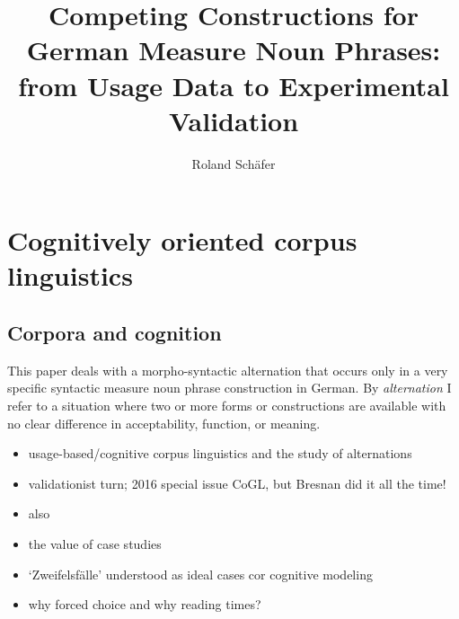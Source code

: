 \documentclass[USenglish]{article}
\begin{document}

  \author*[1]{Roland Schäfer}
  \title{Competing Constructions for German Measure Noun Phrases: from Usage Data to Experimental Validation}
  \abstract{}


  
\maketitle





\section{Cognitively oriented corpus linguistics}
\label{sec:cogocl}

\subsection{Corpora and cognition}

This paper deals with a morpho-syntactic alternation that occurs only in a very specific syntactic measure noun phrase construction in German.
By \textit{alternation} I refer to a situation where two or more forms or constructions are available with no clear difference in acceptability, function, or meaning.

\vspace{\baselineskip}

\begin{itemize}
  \item usage-based/cognitive corpus linguistics and the study of alternations
  \item validationist turn; 2016 special issue CoGL, but Bresnan did it all the time!
  \item also \cite{Gries2015a}
  \item the value of case studies
  \item `Zweifelsfälle' \citep{Klein2009} understood as ideal cases cor cognitive modeling
  \item why forced choice and why reading times?
\end{itemize}
\end{document}
